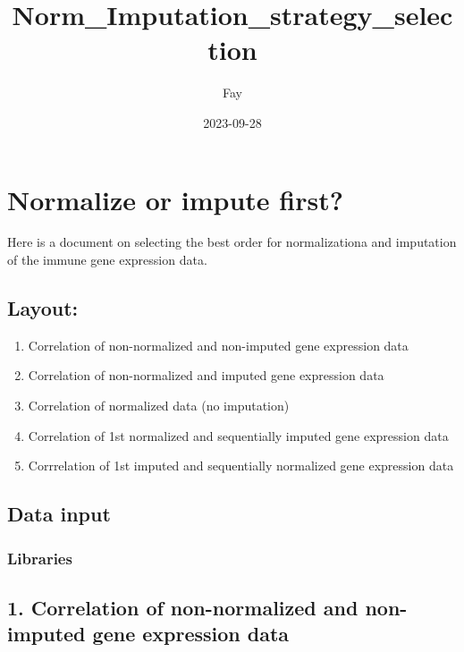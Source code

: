 \documentclass[
]{article}
\title{Norm\_Imputation\_strategy\_selection}
\author{Fay}
\date{2023-09-28}
\providecommand{\tightlist}{%
  \setlength{\itemsep}{0pt}\setlength{\parskip}{0pt}}
\begin{document}
\maketitle

\hypertarget{normalize-or-impute-first}{%
\section{Normalize or impute first?}\label{normalize-or-impute-first}}

Here is a document on selecting the best order for normalizationa and
imputation of the immune gene expression data.

\hypertarget{layout}{%
\subsection{Layout:}\label{layout}}

\begin{enumerate}
\def\labelenumi{\arabic{enumi}.}
\tightlist
\item
  Correlation of non-normalized and non-imputed gene expression data
\item
  Correlation of non-normalized and imputed gene expression data
\item
  Correlation of normalized data (no imputation)
\item
  Correlation of 1st normalized and sequentially imputed gene expression
  data
\item
  Corrrelation of 1st imputed and sequentially normalized gene
  expression data
\end{enumerate}

\hypertarget{data-input}{%
\subsection{Data input}\label{data-input}}

\hypertarget{libraries}{%
\subsubsection{Libraries}\label{libraries}}

\hypertarget{correlation-of-non-normalized-and-non-imputed-gene-expression-data}{%
\subsection{1. Correlation of non-normalized and non-imputed gene
expression
data}\label{correlation-of-non-normalized-and-non-imputed-gene-expression-data}}
\end{document}
